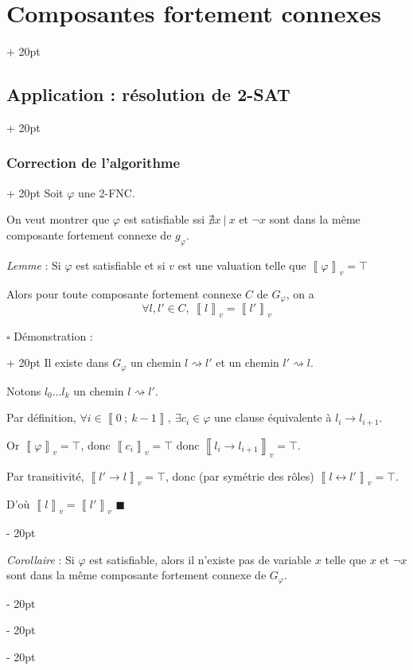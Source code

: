 \documentclass[a4paper, 12pt, twoside]{article}
\newcommand{\nset}[2]{\left\llbracket #1\ ;\ #2 \right\rrbracket}
\newcommand{\lrbb}[1]{\left\llbracket #1 \right\rrbracket}
\newcommand{\ind}[1][20pt]{\advance\leftskip + #1}
\newcommand{\deind}[1][20pt]{\advance\leftskip - #1}
\newenvironment{indt}[2][20pt]{#2 \par \ind[#1]}{\par \deind} %
\newenvironment{proof}[1][{Démonstration :}]{\begin{indt}{$\square$ #1}}{$\blacksquare$ \end{indt}}
\begin{document}
\begin{indt}{\section{Composantes fortement connexes}}
\begin{indt}{\subsection{Application : résolution de 2-SAT}}
            \vspace{12pt}
            
            \begin{indt}{\subsubsection{Correction de l'algorithme}}
                Soit $\varphi$ une 2-FNC.

                On veut montrer que $\varphi$ est satisfiable ssi $\nexists x\ |\ x$ et $\neg x$ sont dans la même composante fortement connexe de $g_\varphi$.

                \begin{pseudocode}
                    \textit{Lemme} :
                    Si $\varphi$ est satisfiable et si $v$ est une valuation telle que $\lrbb{\varphi}_v = \top$

                    Alors pour toute composante fortement connexe $C$ de $G_\varphi$, on a
                    \[
                        \forall l, l' \in C,\ \lrbb l_v = \lrbb{l'}_v
                    \]
                \end{pseudocode}

                \begin{proof}
                    Il existe dans $G_\varphi$ un chemin $l \rightsquigarrow l'$ et un chemin $l' \rightsquigarrow l$.

                    Notons $l_0 \ldots l_k$ un chemin $l \rightsquigarrow l'$.

                    Par définition, $\forall i \in \nset 0 {k - 1},\ \exists c_i \in \varphi$ une clause équivalente à $l_i \rightarrow l_{i + 1}$.

                    Or $\lrbb \varphi _v = \top$, donc $\lrbb{c_i}_v = \top$ donc $\lrbb{l_i \rightarrow l_{i + 1}}_v = \top$.

                    Par transitivité, $\lrbb{l' \rightarrow l}_v = \top$, donc (par symétrie des rôles) $\lrbb{l \leftrightarrow l'}_v = \top$.

                    D'où $\lrbb l _v = \lrbb{l'}_v$
                \end{proof}

                \vspace{12pt}
                
                \begin{pseudocode}
                    \textit{Corollaire} :
                    Si $\varphi$ est satisfiable, alors il n'existe pas de variable $x$ telle que $x$ et $\neg x$ sont dans la même composante fortement connexe de $G_\varphi$.
                \end{pseudocode}


\end{indt}
\end{indt}
\end{indt}
\end{document}

